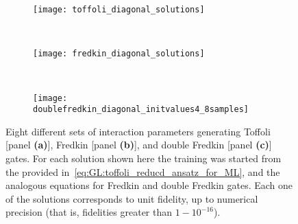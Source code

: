
\begin{figure}[tb]
    \vspace{-50pt}
    \begin{subfigure}{\textwidth}
        \centering
        \caption{}
        \label{fig:GL:toffoli_diagonal_solutions}
        \texttt{[image: toffoli\_diagonal\_solutions]}
    \end{subfigure} \\
    \begin{subfigure}{\textwidth}
        \centering
        \caption{}
        \label{fig:GL:fredkin_diagonal_solutions}
        \texttt{[image: fredkin\_diagonal\_solutions]}
    \end{subfigure} \\
    \begin{subfigure}{\textwidth}
        \centering
        \caption{}
        \label{fig:GL:doublefredkin_diagonal_solutions}
        \texttt{[image: doublefredkin\_diagonal\_initvalues4\_8samples]}
    \end{subfigure}
    \caption{
        Eight different sets of interaction parameters generating Toffoli [panel \textbf{(a)}], Fredkin [panel \textbf{(b)}], and double Fredkin [panel \textbf{(c)}] gates. For each solution shown here the training was started from the \ansatz provided in~\cref{eq:GL:toffoli_reducd_ansatz_for_ML}, and the analogous equations for Fredkin and double Fredkin gates.
        Each one of the solutions corresponds to unit fidelity, up to numerical precision (that is, fidelities greater than $1-10^{-16}$).
    }
    \label{fig:GL:toffoli_diagonal_solutions}
\end{figure}

